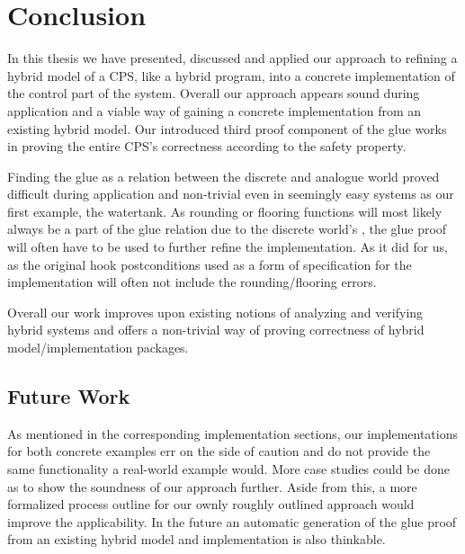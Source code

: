 
\chapter{Conclusion}
\label{ch:Conclusion}

In this thesis we have presented, discussed and applied our approach to refining a hybrid model of a CPS, like a hybrid program, into a concrete implementation of the control part of the system. Overall our approach appears sound during application and a viable way of gaining a concrete implementation from an existing hybrid model. Our introduced third proof component of the glue works in proving the entire CPS's correctness according to the safety property. 

Finding the glue as a relation between the discrete and analogue world proved difficult during application and non-trivial even in seemingly easy systems as our first example, the watertank. As rounding or flooring functions will most likely always be a part of the glue relation due to the discrete world's , the glue proof will often have to be used to further refine the implementation. As it did for us, as the original hook postconditions used as a form of specification for the implementation will often not include the rounding/flooring errors. 

Overall our work improves upon existing notions of analyzing and verifying hybrid systems and offers a non-trivial way of proving correctness of hybrid model/implementation packages.

\section{Future Work}
\label{con:fut} 

As mentioned in the corresponding implementation sections, our implementations for both concrete examples err on the side of caution and do not provide the same functionality a real-world example would. More case studies could be done as to show the soundness of our approach further. Aside from this, a more formalized process outline for our ownly roughly outlined approach would improve the applicability. In the future an automatic generation of the glue proof from an existing hybrid model and implementation is also thinkable.
